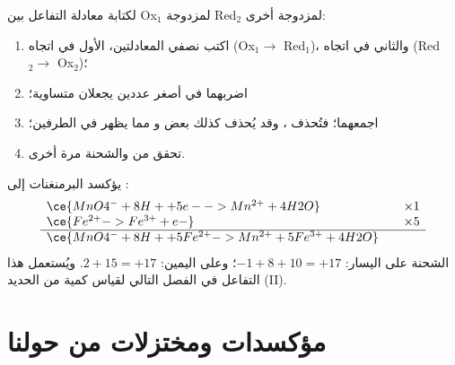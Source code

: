 \begin{method}\label{met:g11:redox:combine}
لكتابة معادلة التفاعل بين  Ox$_1$ لمزدوجة
 Red$_2$ لمزدوجة أخرى:
\begin{enumerate}
  \item اكتب نصفي المعادلتين، الأول في اتجاه
         (Ox$_1 \to$ Red$_1$)، والثاني في اتجاه
         (Red$_2 \to$ Ox$_2$)؛
  \item اضربهما في أصغر عددين يجعلان 
        متساوية؛
  \item اجمعهما؛ فتُحذف ، وقد يُحذف كذلك بعض 
        و مما يظهر في الطرفين؛
  \item تحقق من  والشحنة مرة أخرى.
\end{enumerate}
\end{method}

\begin{example}\label{ex:g11:redox:mno4-fe}
يؤكسد  البرمنغنات   إلى :
\[
\begin{array}{l@{\qquad}l}
  \ce{MnO4^- + 8H+ + 5e- -> Mn^{2+} + 4H2O} & \times 1\\
  \ce{Fe^{2+} -> Fe^{3+} + e-} & \times 5\\
  \hline
  \ce{MnO4^- + 8H+ + 5Fe^{2+} -> Mn^{2+} + 5Fe^{3+} + 4H2O} &
\end{array}
\]
الشحنة على اليسار: $-1 + 8 + 10 = +17$؛ وعلى اليمين: $2 + 15 = +17$.
ويُستعمل هذا التفاعل في الفصل التالي لقياس كمية من
الحديد (II).
\end{example}

\section{مؤكسدات ومختزلات من حولنا}

